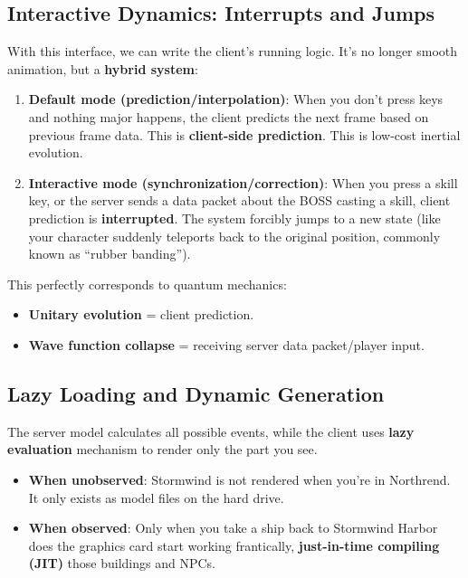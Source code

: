 \subsection{Interactive Dynamics: Interrupts and Jumps}

With this interface, we can write the client's running logic. It's no longer smooth animation, but a \textbf{hybrid system}:

\begin{enumerate}
\item \textbf{Default mode (prediction/interpolation)}: When you don't press keys and nothing major happens, the client predicts the next frame based on previous frame data. This is \textbf{client-side prediction}. This is low-cost inertial evolution.

\item \textbf{Interactive mode (synchronization/correction)}: When you press a skill key, or the server sends a data packet about the BOSS casting a skill, client prediction is \textbf{interrupted}. The system forcibly jumps to a new state (like your character suddenly teleports back to the original position, commonly known as ``rubber banding'').
\end{enumerate}

This perfectly corresponds to quantum mechanics:
\begin{itemize}
\item \textbf{Unitary evolution} = client prediction.
\item \textbf{Wave function collapse} = receiving server data packet/player input.
\end{itemize}

\subsection{Lazy Loading and Dynamic Generation}

The server model calculates all possible events, while the client uses \textbf{lazy evaluation} mechanism to render only the part you see.

\begin{itemize}
\item \textbf{When unobserved}: Stormwind is not rendered when you're in Northrend. It only exists as model files on the hard drive.
\item \textbf{When observed}: Only when you take a ship back to Stormwind Harbor does the graphics card start working frantically, \textbf{just-in-time compiling (JIT)} those buildings and NPCs.
\end{itemize}

